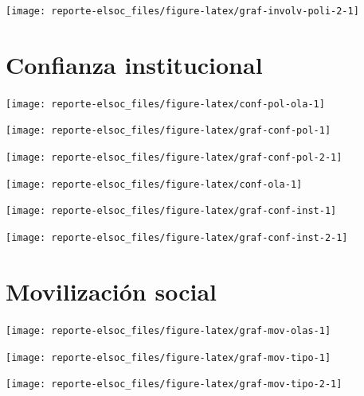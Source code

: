 \documentclass[
  12pt,
]{book}
\begin{document}
\begin{center}\texttt{[image: reporte-elsoc\_files/figure-latex/graf-involv-poli-2-1]} \end{center}

\hypertarget{confianza-institucional}{%
\section{Confianza institucional}\label{confianza-institucional}}

\begin{center}\texttt{[image: reporte-elsoc\_files/figure-latex/conf-pol-ola-1]} \end{center}

\begin{center}\texttt{[image: reporte-elsoc\_files/figure-latex/graf-conf-pol-1]} \end{center}

\begin{center}\texttt{[image: reporte-elsoc\_files/figure-latex/graf-conf-pol-2-1]} \end{center}

\begin{center}\texttt{[image: reporte-elsoc\_files/figure-latex/conf-ola-1]} \end{center}

\begin{center}\texttt{[image: reporte-elsoc\_files/figure-latex/graf-conf-inst-1]} \end{center}

\begin{center}\texttt{[image: reporte-elsoc\_files/figure-latex/graf-conf-inst-2-1]} \end{center}

\hypertarget{movilizaciuxf3n-social}{%
\section{Movilización social}\label{movilizaciuxf3n-social}}

\begin{center}\texttt{[image: reporte-elsoc\_files/figure-latex/graf-mov-olas-1]} \end{center}

\begin{center}\texttt{[image: reporte-elsoc\_files/figure-latex/graf-mov-tipo-1]} \end{center}

\begin{center}\texttt{[image: reporte-elsoc\_files/figure-latex/graf-mov-tipo-2-1]} \end{center}
\end{document}
